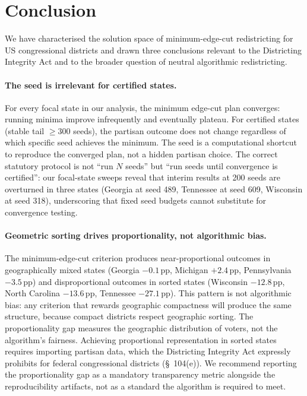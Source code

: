 \section{Conclusion}
\label{sec:conclusion}

We have characterised the solution space of minimum-edge-cut redistricting
for US congressional districts and drawn three conclusions relevant to the
Districting Integrity Act and to the broader question of neutral algorithmic
redistricting.

\paragraph{The seed is irrelevant for certified states.}
For every focal state in our analysis, the minimum edge-cut plan converges:
running minima improve infrequently and eventually plateau. For certified
states (stable tail $\geq 300$ seeds), the partisan outcome does not change
regardless of which specific seed achieves the minimum. The seed is a
computational shortcut to reproduce the converged plan, not a hidden partisan
choice. The correct statutory protocol is not ``run $N$ seeds'' but ``run
seeds until convergence is certified'': our focal-state sweeps reveal that
interim results at 200 seeds are overturned in three states (Georgia at seed
489, Tennessee at seed 609, Wisconsin at seed 318), underscoring that fixed
seed budgets cannot substitute for convergence testing.

\paragraph{Geometric sorting drives proportionality, not algorithmic bias.}
The minimum-edge-cut criterion produces near-proportional outcomes in
geographically mixed states (Georgia $-0.1$\,pp, Michigan $+2.4$\,pp,
Pennsylvania $-3.5$\,pp) and disproportional outcomes in sorted states
(Wisconsin $-12.8$\,pp, North Carolina $-13.6$\,pp, Tennessee $-27.1$\,pp).
This pattern is not algorithmic bias: any criterion that rewards geographic
compactness will produce the same structure, because compact districts respect
geographic sorting. The proportionality gap measures the geographic
distribution of voters, not the algorithm's fairness. Achieving proportional
representation in sorted states requires importing partisan data, which the
Districting Integrity Act expressly prohibits for federal congressional
districts (\S~104(e)). We recommend reporting the proportionality gap as a
mandatory transparency metric alongside the reproducibility artifacts, not as
a standard the algorithm is required to meet.

